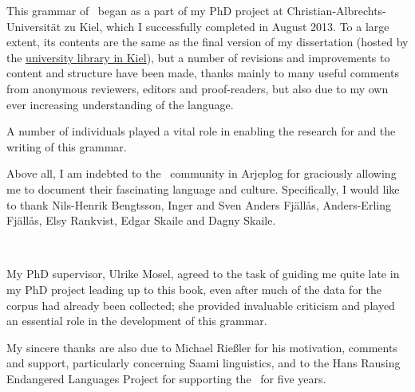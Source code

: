 %


\label{acknowledgements}

This grammar of \PS\ began as a part of my PhD project at Christian-Albrechts-Universität zu Kiel, which I successfully completed in August 2013. To a large extent, its contents are the same as the final version of my dissertation (hosted by the \href{http://macau.uni-kiel.de/receive/dissertation_diss_00013059}{university library in Kiel}), but a number of revisions and improvements to content and structure have been made, thanks mainly to many useful comments from anonymous reviewers, editors and proof-readers, but also due to my own ever increasing understanding of the language. 

A number of individuals played a vital role in enabling the research for and the writing of this grammar. 

\vspace{10pt}
Above all, I am indebted to the \PS\ community in Arjeplog for graciously allowing me to document their fascinating language and culture. %
Specifically, I would like to thank Nils-Henrik Bengtsson, Inger and Sven Anders Fjällås, Anders-Erling Fjällås, Elsy Rankvist, Edgar Skaile and Dagny Skaile. 

{\centering{}\\}
\vspace{10pt}

My PhD supervisor, Ulrike Mosel, agreed to the task of guiding me quite late in my PhD project leading up to this book, even after much of the data for the corpus had already been collected; she provided invaluable criticism and played an essential role in the development of this grammar. %

My sincere thanks are also due %
to Michael Rießler for his motivation, comments and support, particularly concerning Saami linguistics, and 
to the Hans Rausing Endangered Languages Project for supporting the \PSDP\ for five years. 

